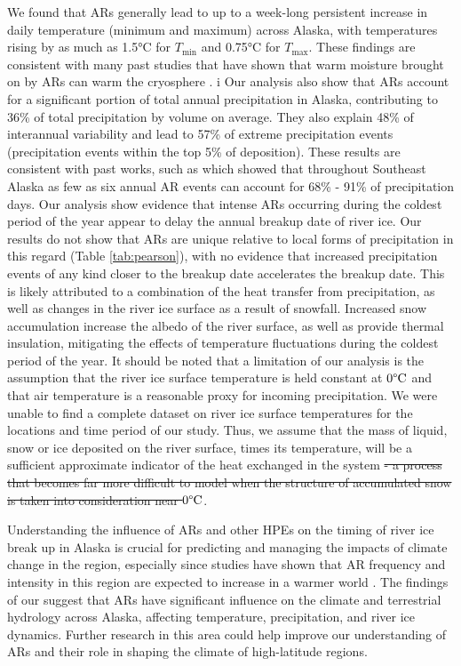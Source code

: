\documentclass[12pts,draft]{AR_analysis_}
\begin{document}
We found that ARs generally lead to up to a week-long persistent 
increase in daily temperature (minimum and maximum) across Alaska, with temperatures rising by as much as 1.5°C 
for $T_{\text{min}}$ and 0.75°C for $T_{\text{max}}$. These findings
are consistent with  
many past studies that have shown that warm moisture brought on by ARs can warm the cryosphere
\cite{Wille2021, Ma2023, ARs_lead_to_sea_ice_loss, Zhang2023}. i
Our analysis also show that ARs account for a significant portion of
total annual precipitation 
in Alaska, contributing to 36\% of total precipitation by volume on 
average. They also explain 48\% 
of interannual variability and lead to 57\% of extreme precipitation events 
(precipitation events within the top 5\% of deposition). These results are
consistent 
with past works, such as  which showed that throughout Southeast Alaska
as few as six annual AR events can account for 68\% - 91\% of precipitation days. 
Our analysis show evidence that intense ARs
occurring during the coldest period of the year appear to delay the annual breakup 
date of river ice. Our results do not show that ARs are unique relative to local forms of 
precipitation in this regard (Table \ref{tab:pearson}), with no evidence that increased 
precipitation events of any kind closer to the breakup date accelerates the breakup date.
This is likely attributed to a combination of the heat transfer from precipitation, 
as well as changes in the river ice surface as a result of snowfall.
Increased snow accumulation
increase the albedo of the river surface, as well as provide thermal
insulation, mitigating the effects of temperature 
fluctuations during the coldest period of the year. It should be noted that a limitation of
our analysis is the assumption that the river ice surface temperature is held constant at
$\mathrm{0\degree C}$ and that air temperature is a reasonable proxy for
incoming precipitation. We were unable to 
find a complete dataset on river ice surface temperatures for the locations and time 
period of our study. Thus, we assume that the mass of liquid, snow or ice deposited on 
the river surface, times its temperature, will be a sufficient
approximate indicator of the heat exchanged in the system \st{- a process that becomes far more difficult to model when the 
structure of accumulated snow is taken into consideration near
	$\mathrm{0\degree C}$}.   

Understanding the influence of ARs and other HPEs on the
timing of river ice break up in Alaska is 
crucial for predicting and managing the impacts of climate change in the region, 
especially since studies have shown that AR frequency and intensity in this region are 
expected to increase in a warmer world \cite{Espinoza2018, Massoud2019}. The findings 
of our suggest that ARs have significant influence on the climate and
terrestrial hydrology across Alaska, 
affecting temperature, precipitation, and river ice dynamics. Further research in this 
area could help improve our understanding of ARs and their role in shaping the climate 
of high-latitude regions.
\end{document}
